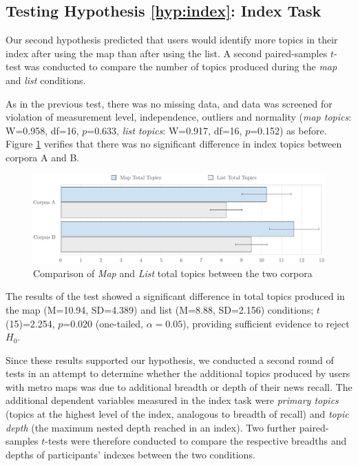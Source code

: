 \subsection{Testing Hypothesis \ref{hyp:index}: Index Task}

Our second hypothesis predicted that users would identify more topics in their index after using the map than after using the list. A second paired-samples $t$-test was conducted to compare the number of topics produced during the \textit{map} and \textit{list} conditions.

As in the previous test, there was no missing data, and data was screened for violation of measurement level, independence, outliers and normality (\textit{map topics}: W=0.958, df=16, $p$=0.633,  \textit{list topics}: W=0.917, df=16, $p$=0.152) as before. Figure \ref{fig:index} verifies that there was no significant difference in index topics between corpora A and B.

\begin{figure}[htbp!]
	\centering
	\includegraphics[width=\textwidth]{img/evaluation/index.pdf}
	\caption{Comparison of \textit{Map} and \textit{List} total topics between the two corpora}
	\label{fig:index}
\end{figure}

The results of the test showed a significant difference in total topics produced in the map (M=10.94, SD=4.389) and list (M=8.88, SD=2.156) conditions; $t$(15)=2.254, $p$=0.020 (one-tailed, $\alpha=0.05$), providing sufficient evidence to reject $H_0$.

Since these results supported our hypothesis, we conducted a second round of tests in an attempt to determine whether the additional topics produced by users with metro maps was due to additional breadth or depth of their news recall. The additional dependent variables measured in the index task were \textit{primary topics} (topics at the highest level of the index, analogous to breadth of recall) and \textit{topic depth} (the maximum nested depth reached in an index). Two further paired-samples $t$-tests were therefore conducted to compare the respective breadths and depths of participants' indexes between the two conditions.

